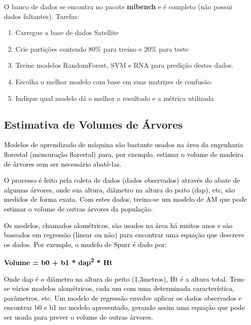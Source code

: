 O banco de dados se encontra no pacote \textbf{mlbench} e é completo (não possui dados faltantes).
\newpage
Tarefas:

\begin{enumerate}[series=listWWNumxxii,label=\arabic*.,ref=\arabic*]
\item Carregue a base de dados Satellite
\item Crie partições contendo 80\% para treino e 20\% para teste
\item Treine modelos RandomForest, SVM e RNA para predição destes dados. 
\item Escolha o melhor modelo com base em suas matrizes de confusão. 
\item Indique qual modelo dá o melhor o resultado e a métrica utilizada
\end{enumerate}




\subsection{Estimativa de Volumes de Árvores}



\textcolor{black}{Modelos de aprendizado de máquina são bastante usados na área da engenharia florestal (mensuração
florestal) para, por exemplo, estimar o volume de madeira de árvores sem ser necessário abatê-las.}

\textcolor{black}{O processo é feito pela coleta de dados (dados observados) através do abate de algumas árvores, onde
sua altura, diâmetro na altura do peito (dap), etc, são medidos de forma exata. Com estes dados, treina-se um modelo de
AM que pode estimar o volume de outras árvores da população.}

\textcolor{black}{Os modelos, chamados alométricos, são usados na área há muitos anos e são baseados em regressão
(linear ou não) para encontrar uma equação que descreve os dados. Por exemplo, o modelo de Spurr é dado por:}



{\centering
\textbf{\textcolor{black}{Volume = b0 + b1 *
dap}}\textbf{\textcolor{black}{\textsuperscript{2}}}\textbf{\textcolor{black}{ * Ht}}
\par}



\textcolor{black}{Onde dap é o diâmetro na altura do peito (1,3metros), Ht é a altura total. Tem-se vários modelos
alométricos, cada um com uma determinada característica, parâmetros, etc. Um modelo de regressão envolve aplicar os
dados observados e encontrar b0 e b1 no modelo apresentado, gerando assim uma equação que pode ser usada para prever o
volume de outras árvores.}

